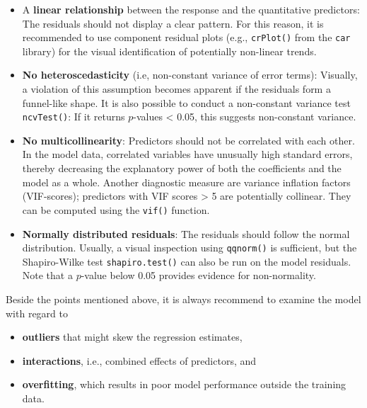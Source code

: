 \documentclass[
  11pt,
  letterpaper,
  DIV=11,
  numbers=noendperiod]{scrreprt}
\begin{document}
\begin{itemize}
\item
  A \textbf{linear relationship} between the response and the
  quantitative predictors: The residuals should not display a clear
  pattern. For this reason, it is recommended to use component residual
  plots (e.g., \texttt{crPlot()} from the \texttt{car} library) for the
  visual identification of potentially non-linear trends.
\item
  \textbf{No heteroscedasticity} (i.e, non-constant variance of error
  terms): Visually, a violation of this assumption becomes apparent if
  the residuals form a funnel-like shape. It is also possible to conduct
  a non-constant variance test \texttt{ncvTest()}: If it returns
  \(p\)-values \textless{} 0.05, this suggests non-constant variance.
\item
  \textbf{No multicollinearity}: Predictors should not be correlated
  with each other. In the model data, correlated variables have
  unusually high standard errors, thereby decreasing the explanatory
  power of both the coefficients and the model as a whole. Another
  diagnostic measure are variance inflation factors (VIF-scores);
  predictors with VIF scores \textgreater{} 5 are potentially collinear.
  They can be computed using the \texttt{vif()} function.
\item
  \textbf{Normally distributed residuals}: The residuals should follow
  the normal distribution. Usually, a visual inspection using
  \texttt{qqnorm()} is sufficient, but the Shapiro-Wilke test
  \texttt{shapiro.test()} can also be run on the model residuals. Note
  that a \(p\)-value below 0.05 provides evidence for non-normality.
\end{itemize}

\begin{tcolorbox}[enhanced jigsaw, toprule=.15mm, opacitybacktitle=0.6, coltitle=black, arc=.35mm, colback=white, title=\textcolor{quarto-callout-important-color}{\faExclamation}\hspace{0.5em}{Important}, titlerule=0mm, toptitle=1mm, bottomtitle=1mm, breakable, rightrule=.15mm, opacityback=0, bottomrule=.15mm, leftrule=.75mm, colframe=quarto-callout-important-color-frame, left=2mm, colbacktitle=quarto-callout-important-color!10!white]

Beside the points mentioned above, it is always recommend to examine the
model with regard to

\begin{itemize}
\item
  \textbf{outliers} that might skew the regression estimates,
\item
  \textbf{interactions}, i.e., combined effects of predictors, and
\item
  \textbf{overfitting}, which results in poor model performance outside
  the training data.
\end{itemize}

\end{tcolorbox}
\end{document}
